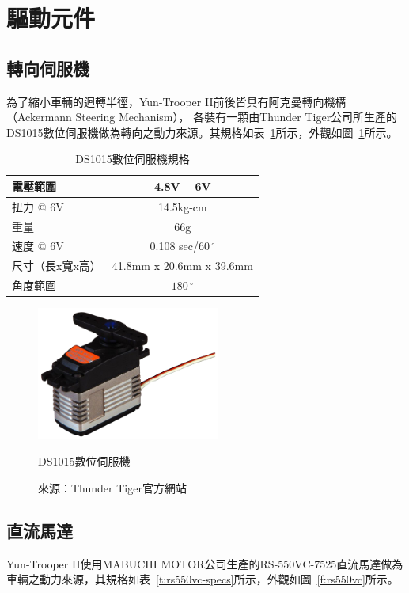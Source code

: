 \section{驅動元件}

\subsection{轉向伺服機}
為了縮小車輛的迴轉半徑，Yun-Trooper II前後皆具有阿克曼轉向機構（Ackermann Steering Mechanism），
各裝有一顆由Thunder Tiger公司所生產的DS1015數位伺服機做為轉向之動力來源。其規格如表~\ref{t:ds1015-specs}所示，外觀如圖~\ref{f:ds1015}所示。

\begin{table}[h!]
	\centering
	\caption{DS1015數位伺服機規格}
	\label{t:ds1015-specs}
	\begin{tabular}{ | l | c |}
		\hline
		電壓範圍 & 4.8V ~ 6V \\ \hline
		扭力 @ 6V & 14.5kg-cm \\ \hline
		重量 & 66g \\ \hline
		速度 @ 6V & 0.108 sec/$60\,^{\circ}$ \\ \hline
		尺寸（長x寬x高） & 41.8mm x 20.6mm x 39.6mm \\ \hline
		角度範圍 & $180\,^{\circ}$ \\
		\hline
	\end{tabular}
\end{table}

\begin{figure}[h!]
	\centering
	\includegraphics[width=6cm]{figures/DS1015}
	\caption{DS1015數位伺服機}
	\caption*{來源：Thunder Tiger官方網站}
	\label{f:ds1015}
\end{figure}

\subsection{直流馬達}
Yun-Trooper II使用MABUCHI MOTOR公司生產的RS-550VC-7525直流馬達做為車輛之動力來源，其規格如表~\ref{t:rs550vc-specs}所示，外觀如圖~\ref{f:rs550vc}所示。

